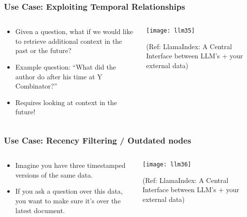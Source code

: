 \begin{frame}[fragile]\frametitle{Use Case: Exploiting Temporal Relationships}

\begin{columns}
    \begin{column}[T]{0.4\linewidth}
		\begin{itemize}
		\item Given a question, what if we would like to retrieve additional context in the past or the future?
		\item Example question: “What did the author do after his time at Y Combinator?” 
		\item Requires looking at context in the future! 
		\end{itemize}	
    \end{column}
    \begin{column}[T]{0.6\linewidth}
		\begin{center}
		\texttt{[image: llm35]}

		{\tiny (Ref: LlamaIndex: A Central Interface between LLM’s + your external data)}
		\end{center}
    \end{column}
  \end{columns}
\end{frame}


\begin{frame}[fragile]\frametitle{Use Case: Recency Filtering / Outdated nodes}

\begin{columns}
    \begin{column}[T]{0.4\linewidth}
		\begin{itemize}
		\item Imagine you have three timestamped versions of the same data.
		\item If you ask a question over this data, you want to make sure it’s over the latest document.
		\end{itemize}	
    \end{column}
    \begin{column}[T]{0.6\linewidth}
		\begin{center}
		\texttt{[image: llm36]}

		{\tiny (Ref: LlamaIndex: A Central Interface between LLM’s + your external data)}
		\end{center}
    \end{column}
  \end{columns}
\end{frame}

